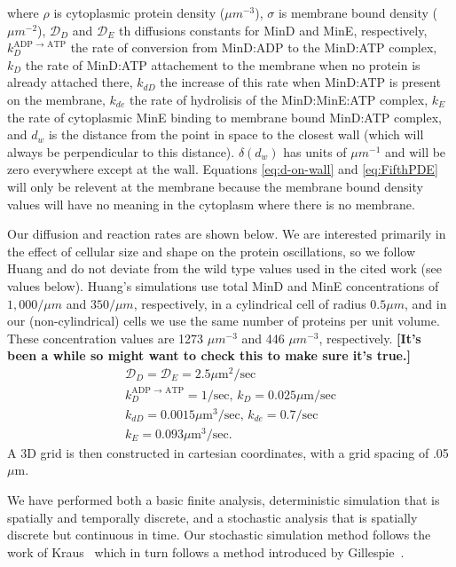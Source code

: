 \documentclass[letterpaper,twocolumn,amsmath,amssymb,pre]{revtex4-1}
\newcommand{\red}[1]{{\bf \color{red} #1}}
\newcommand{\fixme}[1]{\red{[#1]}}
\newcommand\micron{\ensuremath{\mu\text{m}}}
\begin{document}
where $\rho$ is cytoplasmic protein density ($\mu m^{-3}$), $\sigma$
is membrane bound density ($\mu m^{-2}$), $\mathcal{D}_D$ and
$\mathcal{D}_{E}$ th diffusions constants for MinD and MinE,
respectively, $k_D^{\textrm{ADP $\rightarrow$ ATP}}$ the rate of
conversion from MinD:ADP to the MinD:ATP complex, $k_D$ the rate of
MinD:ATP attachement to the membrane when no protein is already
attached there, $k_{dD}$ the increase of this rate when MinD:ATP is
present on the membrane, $k_{de}$ the rate of hydrolisis of the
MinD:MinE:ATP complex, $k_E$ the rate of cytoplasmic MinE binding to
membrane bound MinD:ATP complex, and $d_w$ is the distance from the
point in space to the closest wall (which will always be
perpendicular to this distance).  $\delta(d_w)$ has units of
$\mu m^{-1}$ and will be zero everywhere except at the wall.
Equations \ref{eq:d-on-wall} and \ref{eq:FifthPDE} will only be
relevent at the membrane because the membrane bound density values
will have no meaning in the cytoplasm where there is no membrane.

Our diffusion and reaction rates are shown below.  We are interested
primarily in the effect of cellular size and shape on the protein
oscillations, so we follow Huang\cite{huang2003dynamic} and do not
deviate from the wild type values used in the cited work (see values
below).  Huang's simulations use total MinD and MinE concentrations of
$1,000/\mu m$ and $350/\mu m$, respectively, in a cylindrical cell of
radius $0.5\mu m$, and in our (non-cylindrical) cells we use the same
number of proteins per unit volume.  These concentration values are
1273 $\mu m^{-3}$ and 446 $\mu m^{-3}$, respectively. \fixme{It's been
  a while so might want to check this to make sure it's true.}
\begin{gather*}
  \mathcal{D}_D = \mathcal{D}_{E} = 2.5\micron^2/\text{sec}\\
  k_D^{\textrm{ADP $\rightarrow$ ATP}} = 1/\textrm{sec,  }
  k_D = 0.025 \micron /\textrm{sec}\\
  k_{dD} = 0.0015 \micron^3/ \textrm{sec,  }
  k_{de} = 0.7/\textrm{sec}\\
  k_E = 0.093 \micron^3 /\textrm{sec}.
\end{gather*}
A 3D grid is then constructed in cartesian coordinates, with a grid
spacing of .05\micron.

We have performed both a basic finite analysis, deterministic
simulation that is spatially and temporally discrete, and a stochastic
analysis that is spatially discrete but continuous in time.  Our
stochastic simulation method follows the work of
Kraus~\cite{kraus1996crosstalk} which in turn follows a method
introduced by Gillespie~\cite{gillespie1977exact}.
\end{document}
